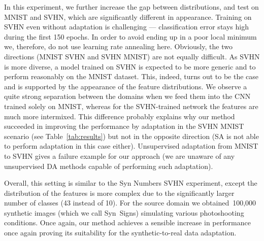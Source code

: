 \documentclass{article}
\newcommand{\tab}[1]{Table~\ref{tab:#1}}
\begin{document}
\vspace{2mm}
In this experiment, we further increase the gap between distributions, and test on {\sc MNIST} and {\sc SVHN}, which are significantly different in appearance. Training on SVHN even without adaptation is challenging --- classification error stays high during the first 150 epochs. In order to avoid ending up in a poor local minimum we, therefore, do not use learning rate annealing here. Obviously, the two directions ({\sc MNIST}  {\sc SVHN} and {\sc SVHN}  {\sc MNIST}) are not equally difficult. As {\sc SVHN} is more diverse, a model trained on SVHN is expected to be more generic and to perform reasonably on the MNIST dataset. This, indeed, turns out to be the case and is supported by the appearance of the feature distributions. We observe a quite strong separation between the domains when we feed them into the CNN trained solely on { \sc MNIST}, whereas for the {\sc SVHN}-trained network the features are much more intermixed. This difference probably explains why our method succeeded in improving the performance by adaptation in the {\sc SVHN}  {\sc MNIST} scenario (see \tab{results}) but not in the opposite direction (SA is not able to perform adaptation in this case either). Unsupervised adaptation from MNIST to SVHN gives a failure example for our approach (we are unaware of any unsupervised DA methods capable of performing such adaptation).

\vspace{2mm}
Overall, this setting is similar to the {\sc Syn Numbers}  {\sc SVHN} experiment, except the distribution of the features is more complex due to the significantly larger number of classes (43 instead of 10). For the source domain we obtained~100,000 synthetic images (which we call {\sc Syn~Signs}) simulating various photoshooting conditions. Once again, our method achieves a sensible increase in performance once again proving its suitability for the synthetic-to-real data adaptation.
\end{document}
